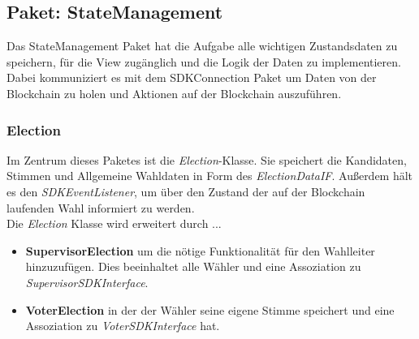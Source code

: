 \documentclass[parskip=full]{scrartcl}
\newcommand{\textitx}[1]{\mbox{\textit{#1}}}
\newcommand{\fakeparagraph}[1]{\textbf{#1}}
\begin{document}
	\subsection{Paket: StateManagement}
	Das StateManagement Paket hat die Aufgabe alle wichtigen Zustandsdaten zu speichern, für die View zugänglich und die Logik der Daten zu implementieren.
	Dabei kommuniziert es mit dem SDKConnection Paket um Daten von der Blockchain zu holen und Aktionen auf der Blockchain auszuführen.
	
		\subsubsection{Election}
		Im Zentrum dieses Paketes ist die \textitx{Election}-Klasse. Sie speichert die Kandidaten, Stimmen und Allgemeine Wahldaten in Form des \textitx{ElectionDataIF}. Außerdem hält es den \textit{SDKEventListener}, um über den Zustand der auf
		der Blockchain laufenden Wahl informiert zu werden.\\
		Die \textitx{Election} Klasse wird erweitert durch ...
		\begin{itemize}
			\item\fakeparagraph{SupervisorElection} um die nötige Funktionalität für den Wahlleiter hinzuzufügen. Dies beeinhaltet alle Wähler und eine Assoziation zu \textitx{SupervisorSDKInterface}.
			\item\fakeparagraph{VoterElection} in der der Wähler seine eigene Stimme speichert und eine Assoziation zu \textitx{VoterSDKInterface} hat.
		\end{itemize}
		
\end{document}
